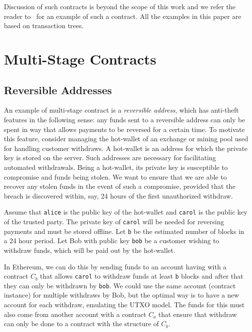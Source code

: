 \documentclass[runningheads]{llncs}
\begin{document}
Discussion of such contracts is beyond the scope of this work and we refer the reader to~\cite[Section 3.3.3]{advtutorial} for an example of such a contract. All the examples in this paper are based on transaction trees.

\section{Multi-Stage Contracts}

\subsection{Reversible Addresses}
\label{reversible}

An example of multi-stage contract is a {\em reversible address}, which has anti-theft features in the following sense: any funds sent to a reversible address can only be spent in way that allows payments to be reversed for a certain time. To motivate this feature, consider managing the hot-wallet of an exchange or mining pool used for handling customer withdraws. A hot-wallet is an address for which the private key is stored on the server. Such addresses are necessary for facilitating automated withdrawals. Being a hot-wallet, its private key is susceptible to compromise and funds being stolen. 
We want to ensure that we are able to recover any stolen funds in the event of such a compromise, provided that the breach is discovered within, say, 24 hours of the first unauthorized withdraw. %

Assume that \texttt{alice} is the public key of the hot-wallet and \texttt{carol} is the public key of the trusted party. The private key of \texttt{carol} will be needed for reversing payments and must be stored offline. Let \texttt{b} be the estimated number of blocks in a 24 hour period. 
Let Bob with public key \texttt{bob} be a customer wishing to withdraw funds, which will be paid out by the hot-wallet. 

In Ethereum, we can do this by sending funds to an account having with a contract $C_{b}$ that allows \texttt{carol} to withdraw funds at least \texttt{b} blocks and after that they can only be withdrawn by \texttt{bob}. We could use the same account (contract instance) for multiple withdraws by Bob, but the optimal way is to have a new account for each withdraw, emulating the UTXO model. The funds for this must also come from another account with a contract $C_{a}$ that ensure that withdraw can only be done to a contract with the structure of $C_{b}$. 
\end{document}

